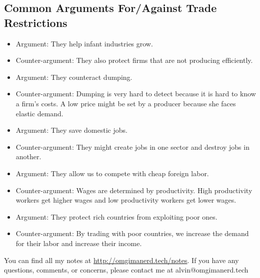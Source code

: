 \documentclass{article}
\begin{document}
\subsection{Common Arguments For/Against Trade Restrictions}
\begin{itemize}
  \item Argument: They help infant industries grow.
  \item Counter-argument: They also protect firms that are not producing
  efficiently.
  \item Argument: They counteract dumping.
  \item Counter-argument: Dumping is very hard to detect because it
  is hard to know a firm's costs. A low price might be set by a producer
  because she faces elastic demand.
  \item Argument: They save domestic jobs.
  \item Counter-argument: They might create jobs in one sector and destroy
  jobs in another.
  \item Argument: They allow us to compete with cheap foreign labor.
  \item Counter-argument: Wages are determined by productivity. High
  productivity workers get higher wages and low productivity workers get lower
  wages.
  \item Argument: They protect rich countries from exploiting poor ones.
  \item Counter-argument: By trading with poor countries, we increase the
  demand for their labor and increase their income.
\end{itemize}

\begin{center}
  You can find all my notes at \url{http://omgimanerd.tech/notes}. If you have
  any questions, comments, or concerns, please contact me at
  alvin@omgimanerd.tech
\end{center}
\end{document}
